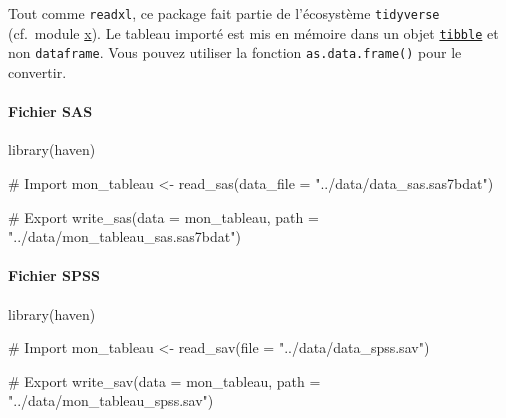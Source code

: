 \documentclass[
  letterpaper,
  DIV=11,
  numbers=noendperiod]{scrartcl}
\let\oldparagraph\paragraph
\renewcommand{\paragraph}[1]{\oldparagraph{#1}\mbox{}}
\newenvironment{Shaded}{\begin{snugshade}}{\end{snugshade}}
\newcommand{\AttributeTok}[1]{\textcolor[rgb]{0.40,0.45,0.13}{#1}}
\newcommand{\CommentTok}[1]{\textcolor[rgb]{0.37,0.37,0.37}{#1}}
\newcommand{\FunctionTok}[1]{\textcolor[rgb]{0.28,0.35,0.67}{#1}}
\newcommand{\NormalTok}[1]{\textcolor[rgb]{0.00,0.23,0.31}{#1}}
\newcommand{\OtherTok}[1]{\textcolor[rgb]{0.00,0.23,0.31}{#1}}
\newcommand{\StringTok}[1]{\textcolor[rgb]{0.13,0.47,0.30}{#1}}
\begin{document}
\begin{tcolorbox}[enhanced jigsaw, opacityback=0, bottomrule=.15mm, titlerule=0mm, left=2mm, bottomtitle=1mm, title=\textcolor{quarto-callout-important-color}{\faExclamation}\hspace{0.5em}{Important}, opacitybacktitle=0.6, breakable, colbacktitle=quarto-callout-important-color!10!white, leftrule=.75mm, colframe=quarto-callout-important-color-frame, rightrule=.15mm, toprule=.15mm, coltitle=black, arc=.35mm, colback=white, toptitle=1mm]

Tout comme \texttt{readxl}, ce package fait partie de l'écosystème
\texttt{tidyverse} (cf.~module \href{}{x}). Le tableau importé est mis
en mémoire dans un objet
\href{https://tibble.tidyverse.org/}{\texttt{tibble}} et non
\texttt{dataframe}. Vous pouvez utiliser la fonction
\texttt{as.data.frame()} pour le convertir.

\end{tcolorbox}

\hypertarget{fichier-sas}{%
\paragraph{Fichier SAS}\label{fichier-sas}}

\begin{Shaded}
\begin{Highlighting}[]
\FunctionTok{library}\NormalTok{(haven)}

\CommentTok{\# Import}
\NormalTok{mon\_tableau  }\OtherTok{\textless{}{-}} \FunctionTok{read\_sas}\NormalTok{(}\AttributeTok{data\_file =} \StringTok{"../data/data\_sas.sas7bdat"}\NormalTok{)}

\CommentTok{\# Export}
\FunctionTok{write\_sas}\NormalTok{(}\AttributeTok{data =}\NormalTok{ mon\_tableau, }\AttributeTok{path =} \StringTok{"../data/mon\_tableau\_sas.sas7bdat"}\NormalTok{)}
\end{Highlighting}
\end{Shaded}

\hypertarget{fichier-spss}{%
\paragraph{Fichier SPSS}\label{fichier-spss}}

\begin{Shaded}
\begin{Highlighting}[]
\FunctionTok{library}\NormalTok{(haven)}

\CommentTok{\# Import}
\NormalTok{mon\_tableau  }\OtherTok{\textless{}{-}} \FunctionTok{read\_sav}\NormalTok{(}\AttributeTok{file =}  \StringTok{"../data/data\_spss.sav"}\NormalTok{)}

\CommentTok{\# Export}
\FunctionTok{write\_sav}\NormalTok{(}\AttributeTok{data =}\NormalTok{ mon\_tableau, }\AttributeTok{path =}  \StringTok{"../data/mon\_tableau\_spss.sav"}\NormalTok{)}
\end{Highlighting}
\end{Shaded}
\end{document}
